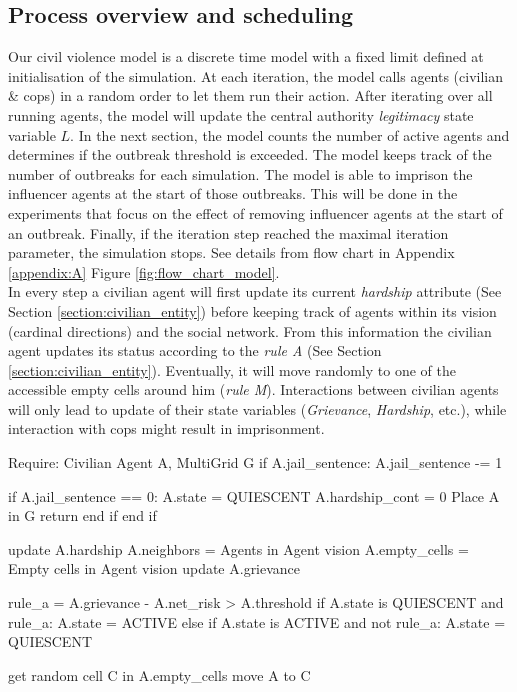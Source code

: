 \documentclass[10pt]{article}
\begin{document}
    \subsection{Process overview and scheduling}

    Our civil violence model is a discrete time model with a fixed limit defined at initialisation of the simulation. At each iteration, the model calls agents (civilian \& cops) in a random order to let them run their action. After iterating over all running agents, the model will update the central authority \emph{legitimacy} state variable $L$. In the next section, the model counts the number of active agents and determines if the outbreak threshold is exceeded. The model keeps track of the number of outbreaks for each simulation. The model is able to imprison the influencer agents at the start of those outbreaks. This will be done in the experiments that focus on the effect of removing influencer agents at the start of an outbreak. Finally, if the iteration step reached the maximal iteration parameter, the simulation stops. See details from flow chart in Appendix \ref{appendix:A} Figure \ref{fig:flow_chart_model}.\\

    In every step a civilian agent will first update its current \emph{hardship} attribute (See Section \ref{section:civilian_entity}) before keeping track of agents within its vision (cardinal directions) and the social network. From this information the civilian agent updates its status according to the \emph{rule A} (See Section \ref{section:civilian_entity}). Eventually, it will move randomly to one of the accessible empty cells around him (\emph{rule M}). Interactions between civilian agents will only lead to update of their state variables (\emph{Grievance}, \emph{Hardship}, etc.), while interaction with cops might result in imprisonment.\\


    \begin{algorithm}[caption = {Role: Civilian agent}]
        Require: Civilian Agent A, MultiGrid G
        if A.jail_sentence:
        A.jail_sentence -= 1

        if A.jail_sentence == 0:
        A.state = QUIESCENT
        A.hardship_cont = 0
        Place A in G
        return
        end if
        end if

        update A.hardship
        A.neighbors     = Agents in Agent vision
        A.empty_cells   = Empty cells in Agent vision
        update A.grievance

        rule_a = A.grievance - A.net_risk > A.threshold
        if A.state is QUIESCENT and rule_a:
        A.state = ACTIVE
        else if A.state is ACTIVE and not rule_a:
        A.state = QUIESCENT

        get random cell C in A.empty_cells
        move A to C
    \end{algorithm}
\end{document}
